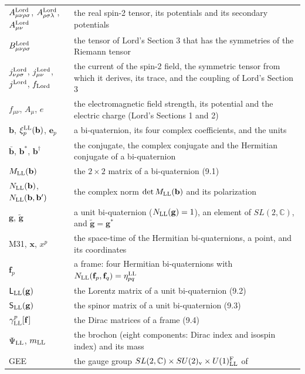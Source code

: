 \documentclass[
  10pt,
]{article}
\begin{document}
\begin{longtable}[]{@{}
  >{\raggedright\arraybackslash}p{}
  >{\raggedright\arraybackslash}p{}@{}}
\(A^{\rm Lord}_{\mu\nu\rho\sigma}\),
\(A^{\rm Lord}_{\rho\sigma\lambda}\), \(A^{\rm Lord}_{\mu\nu}\) & the
real spin-2 tensor, its potentials and its secondary potentials \\
\(B^{\rm Lord}_{\mu\nu\rho\sigma}\) & the tensor of Lord's Section 3
that has the symmetries of the Riemann tensor \\
\(j^{\rm Lord}_{\nu\rho\sigma}\), \(j^{\rm Lord}_{\mu\nu}\),
\(j^{\rm Lord}\), \(f_{\rm Lord}\) & the current of the spin-2 field,
the symmetric tensor from which it derives, its trace, and the coupling
of Lord's Section 3 \\
\(f_{\mu\nu}\), \(A_\mu\), \(e\) & the electromagnetic field strength,
its potential and the electric charge (Lord's Sections 1 and 2) \\
\(\mathbf b\), \(\xi^{\rm LL}_p(\mathbf b)\), \(\mathbf e_p\) & a
bi-quaternion, its four complex coefficients, and the units \\
\(\bar{\mathbf b}\), \(\mathbf b^*\), \(\mathbf b^\dagger\) & the
conjugate, the complex conjugate and the Hermitian conjugate of a
bi-quaternion \\
\(M_{\rm LL}(\mathbf b)\) & the \(2\times2\) matrix of a bi-quaternion
(9.1) \\
\(N_{\rm LL}(\mathbf b)\), \(N_{\rm LL}(\mathbf b,\mathbf b')\) & the
complex norm \(\det M_{\rm LL}(\mathbf b)\) and its polarization \\
\(\mathbf g\), \(\tilde{\mathbf g}\) & a unit bi-quaternion
(\(N_{\rm LL}(\mathbf g)=1\)), an element of \(SL(2,\mathbb C)\), and
\(\tilde{\mathbf g}=\mathbf g^*\) \\
M31, \(\mathbf x\), \(x^p\) & the space-time of the Hermitian
bi-quaternions, a point, and its coordinates \\
\(\mathbf f_p\) & a frame: four Hermitian bi-quaternions with
\(N_{\rm LL}(\mathbf f_p,\mathbf f_q)=\eta^{\rm LL}_{pq}\) \\
\(\mathsf L_{\rm LL}(\mathbf g)\) & the Lorentz matrix of a unit
bi-quaternion (9.2) \\
\(\mathsf S_{\rm LL}(\mathbf g)\) & the spinor matrix of a unit
bi-quaternion (9.3) \\
\(\gamma^p_{\rm LL}[\mathbf f]\) & the Dirac matrices of a frame
(9.4) \\
\(\Psi_{\rm LL}\), \(m_{\rm LL}\) & the brochon (eight components: Dirac
index and isospin index) and its mass \\
GEE & the gauge group
\(SL(2,\mathbb C)\times SU(2)_{\rm v}\times U(1)^{\rm F}_{\rm LL}\) of

\end{longtable}
\end{document}
